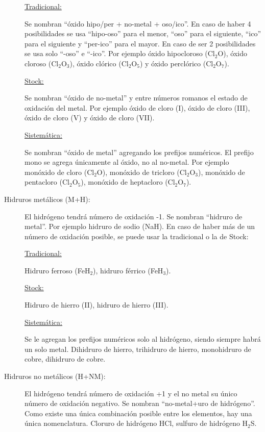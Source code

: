 \begin{description}
\underline{Tradicional:}

Se nombran ``óxido hipo/per + no-metal + oso/ico''. En caso de haber 4 posibilidades se usa ``hipo-oso'' para el menor, ``oso'' para el siguiente, ``ico'' para el siguiente y ``per-ico'' para el mayor. En caso de ser 2 posibilidades se usa solo ``-oso'' e ``-ico''. Por ejemplo óxido hipocloroso (Cl$_2$O), óxido cloroso (Cl$_2$O$_3$), óxido clórico (Cl$_2$O$_5$) y óxido perclórico (Cl$_2$O$_7$).

\underline{Stock:}

Se nombran ``óxido de no-metal'' y entre números romanos el estado de oxidación del metal. Por ejemplo óxido de cloro (I), óxido de cloro (III), óxido de cloro (V) y óxido de cloro (VII).

\underline{Sistemática:}

Se nombran ``óxido de metal'' agregando los prefijos numéricos. El prefijo mono se agrega únicamente al óxido, no al no-metal. Por ejemplo monóxido de cloro (Cl$_2$O), monóxido de tricloro (Cl$_2$O$_3$), monóxido de pentacloro (Cl$_2$O$_5$), monóxido de heptacloro (Cl$_2$O$_7$).
\skipline




\newpage
\item[Hidruros metálicos (M+H):]\hfil

El hidrógeno tendrá número de oxidación -1. Se nombran ``hidruro de metal''. Por ejemplo hidruro de sodio (NaH). En caso de haber más de un número de oxidación posible, se puede usar la tradicional o la de Stock:

\underline{Tradicional:}

Hidruro ferroso (FeH$_2$), hidruro férrico (FeH$_3$).

\underline{Stock:}

Hidruro de hierro (II), hidruro de hierro (III).

\underline{Sistemática:}

Se le agregan los prefijos numéricos solo al hidrógeno, siendo siempre habrá un solo metal. Dihidruro de hierro, trihidruro de hierro, monohidruro de cobre, dihidruro de cobre.





\item[Hidruros no metálicos (H+NM):]\hfil

El hidrógeno tendrá número de oxidación +1 y el no metal su único número de oxidación negativo. Se nombran ``no-metal+uro de hidrógeno''. Como existe una única combinación posible entre los elementos, hay una única nomenclatura. Cloruro de hidrógeno HCl, sulfuro de hidrógeno H$_2$S.


\end{description}
